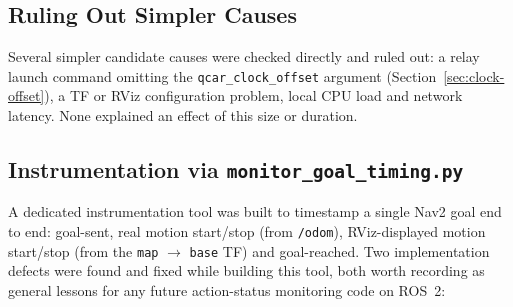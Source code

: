 \subsection{Ruling Out Simpler Causes}
\label{sec:display-lag-rule-out}

Several simpler candidate causes were checked directly and ruled out:
a relay launch command omitting the \texttt{qcar\_clock\_offset}
argument (Section~\ref{sec:clock-offset}), a TF or RViz configuration
problem, local CPU load and network latency. None explained an effect
of this size or duration.

\subsection{Instrumentation via \texttt{monitor\_goal\_timing.py}}
\label{sec:monitor-goal-timing}

A dedicated instrumentation tool was built to timestamp a single Nav2
goal end to end: goal-sent, real motion start/stop (from
\texttt{/odom}), RViz-displayed motion start/stop (from the
\texttt{map} $\rightarrow$ \texttt{base} TF) and goal-reached. Two
implementation defects were found and fixed while building this tool,
both worth recording as general lessons for any future action-status
monitoring code on ROS~2:


